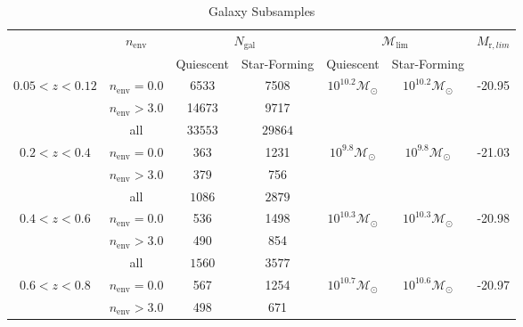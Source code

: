 \documentclass{emulateapj}
\def \lowenvthresh {0.0}
\def \highenvthresh {3.0}
\begin{document}
\begin{table} 
  \caption{Galaxy Subsamples}
  \label{tab:subsample}
  \begin{center}
    \leavevmode
    \begin{tabular}{ccccccc} \hline \hline              
     &\multicolumn{1}{c}{$n_{\mathrm{env}}$}        & \multicolumn{2}{c}{$N_{\mathrm{gal}}$}  & \multicolumn{2}{c}{$\mathcal{M}_{\mathrm{lim}}$} & $M_{\mathrm{r}, lim}$ \\ 
    & & Quiescent & Star-Forming & Quiescent & Star-Forming &  \\ \hline 
$0.05 < z < 0.12$ & $n_{\mathrm{env}} = \lowenvthresh $ & 6533 & 7508 & $10^{10.2} \mathcal{M}_{\odot}$ & $10^{10.2} \mathcal{M}_{\odot}$ & -20.95 \\
               & $n_{\mathrm{env}} > \highenvthresh $ &14673 & 9717 &                          \\ 
                              & all          &$33553$                       & $29864$                          \\ \hline
$0.2 < z < 0.4$      &$n_{\mathrm{env}} = \lowenvthresh $           &363                    &1231 & $10^{9.8} \mathcal{M}_{\odot}$ & $10^{9.8} \mathcal{M}_{\odot}$ &-21.03 \\
               &$n_{\mathrm{env}} > \highenvthresh $            &379                    &756                           \\
               & all                & $1086$                      & $2879$                          \\ \hline
$0.4 < z < 0.6$      &$n_{\mathrm{env}} = \lowenvthresh $           &536                       &1498 & $10^{10.3} \mathcal{M}_{\odot}$ & $10^{10.3} \mathcal{M}_{\odot}$ & -20.98 \\
               &$n_{\mathrm{env}} > \highenvthresh $            &490                       &854                           \\
               & all               & $1560$                      & $3577$                          \\ \hline
$0.6 < z < 0.8$      &$n_{\mathrm{env}} = \lowenvthresh $           &567                       &1254  & $10^{10.7} \mathcal{M}_{\odot}$ & $10^{10.6} \mathcal{M}_{\odot}$ & -20.97 \\
               &$n_{\mathrm{env}} > \highenvthresh $            &498                       &671                           \\

\end{tabular}
\end{center}
\end{table}
\end{document}
